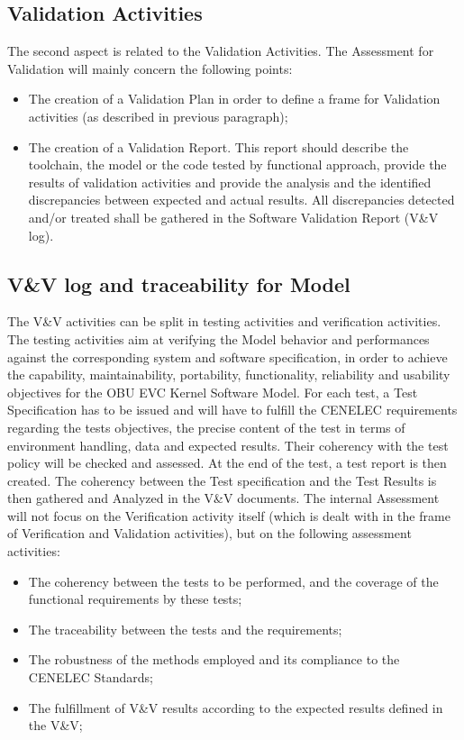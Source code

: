 \documentclass{template/openetcs_article}
\begin{document}
\subsection{Validation Activities}
The second aspect is related to the Validation Activities. The Assessment for Validation will mainly concern the following points:
\begin{itemize}
\item The creation of a Validation Plan in order to define a frame for Validation activities (as described in previous paragraph);
\item The creation of a Validation Report. This report should describe the toolchain, the model or the code tested by functional approach, provide the results of validation activities and provide the analysis and the identified discrepancies  between expected and actual results. All discrepancies detected and/or treated shall be gathered in the Software Validation Report (V\&V log).
\end{itemize}

\subsection{V\&V log and traceability for Model}
The V\&V activities can be split in testing activities and verification activities. The testing activities aim at verifying the Model behavior and performances against the corresponding system and software specification, in order to achieve the capability, maintainability, portability, functionality, reliability and usability objectives for the OBU EVC Kernel Software Model. 
For each test, a Test Specification has to be issued and will have to fulfill the CENELEC requirements regarding the tests objectives, the precise content of the test in terms of environment handling, data and expected results. Their coherency with the test policy will be checked and assessed. At the end of the test, a test report is then created. The coherency between the Test specification and the Test Results is then gathered and Analyzed in the V\&V documents.
The internal Assessment will not focus on the Verification activity itself (which is dealt with in the frame of Verification and Validation activities), but on the following assessment activities:
\begin{itemize}
\item The coherency between the tests to be performed, and the coverage of the functional requirements by these tests;
\item The traceability between the tests and the requirements;
\item The robustness of the  methods employed and its compliance to the CENELEC Standards;
\item The fulfillment of V\&V results according to the expected results defined in the V\&V;
\end{itemize}
\end{document}
